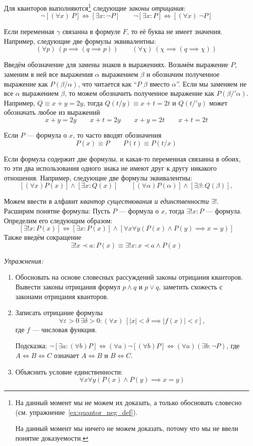 Для кванторов выполняются\footnote{
	На данный момент мы не можем их доказать, а только
	обосновать словесно (см. упражнение~\ref{ex:quantor_neg_def}).

	На данный момент мы ничего не можем доказать, потому что мы не ввели
	понятие доказуемости.}
следующие {\it законы отрицания}:
\[
	\lnot[(\forall x)~P]\iff[\exists x:\lnot P]\qquad
	\lnot[\exists x:P]\iff[(\forall x)~\lnot P]
\]

Если переменная $\gamma$ связанна в формуле $F$, то её буква не имеет значения.
Например, следующие две формулы эквивалентны:
\[
	(\forall p)~(p\implies (q\implies p))\qquad
	(\forall \chi)~(\chi\implies (q\implies\chi))
\]

Введём обозначение для замены знаков в выражениях.
Возьмём выражение $P$, заменим в ней все выражения $\alpha$ выражением $\beta$ и
обозначим полученное выражение как $P(\beta/\alpha)$, что читается как
``$P$ $\beta$ вместо $\alpha$''.
Если мы заменяем не все $\alpha$ выражением $\beta$, то можем обозначить полученное
выражение как $P(\beta/'\alpha)$.
Например, $Q\equiv x+y=2y$, тогда $Q(t/y)\equiv x+t=2t$ и $Q(t/'y)$ может
обозначать любое из выражений
\[
	x+y=2y\qquad x+t=2y\qquad x+y=2t\qquad x+t=2t
\]

Если $P$ --- формула о $x$, то часто вводят обозначения
\[
	P(x)\equiv P\qquad P(t)\equiv P(t/x)
\]

Если формула содержит две формулы, и какая-то переменная
связанна в обоих, то эти два использования
одного знака не имеют друг к другу никакого отношения.
Например, следующие две формулы эквивалентны:
\[
	[(\forall x)P(x)]\land[\exists x:Q(x)]\qquad
	[(\forall \alpha)P(\alpha)]\land[\exists \beta:Q(\beta)],
\]

\label{page:exists_only}
Можем ввести в алфавит {\it квантор существования и единственности} $\exists!$.
Расширим понятие формулы: Пусть $P$ --- формула о $x$,
тогда ${\exists! x:P}$ --- формула. Определим его следующим образом:
\[
	[\exists! x:P(x)]\iff[\exists x:P(x)]\land
	[\forall x\forall y(P(x)\land P(y)\implies x=y)]
\]
Также введём сокращение
\[
	\exists! x\prec a:P(x)\equiv \exists! x:x\prec a\land P(x)
\]

\vspace{1em}
{\it Упражнения:}
\begin{enumerate}
	\item{}Обосновать на основе словесных рассуждений законы отрицания
		кванторов\label{ex:quantor_neg_def}. Вывести законы отрицания формул
		$p\land q$ и $p\lor q$, заметить схожесть с законами отрицания кванторов.
	\item{}Записать отрицание формулы
		\[
			\forall \varepsilon>0~\exists \delta>0:
			(\forall x)~[|x|<\delta\implies |f(x)|<\varepsilon],
		\]
		где $f$ --- числовая функция.

		Подсказка:
		${\lnot[\exists a:(\forall b)P]\iff(\forall a)\lnot[(\forall b)P]\iff
		(\forall a)(\exists b:\lnot P)}$,
		где $A\iff B\iff C$ означает $A\iff B$ и $B\iff C$.

	\item{}Объяснить условие единственности:
		\[
			\forall x\forall y(P(x)\land P(y)\implies x=y)
		\]
\end{enumerate}
